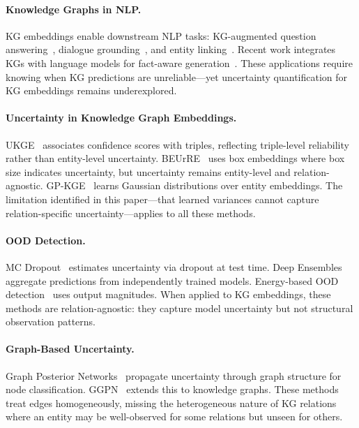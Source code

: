 
\paragraph{Knowledge Graphs in NLP.}
KG embeddings enable downstream NLP tasks: KG-augmented question answering~\citep{zhang2018variational,yasunaga2021qa}, dialogue grounding~\citep{moon2019opendialkg}, and entity linking~\citep{wu2020scalable}.
Recent work integrates KGs with language models for fact-aware generation~\citep{liu2020k,wang2021kepler}.
These applications require knowing when KG predictions are unreliable---yet uncertainty quantification for KG embeddings remains underexplored.

\paragraph{Uncertainty in Knowledge Graph Embeddings.}
UKGE~\citep{chen2019embedding} associates confidence scores with triples, reflecting triple-level reliability rather than entity-level uncertainty.
BEUrRE~\citep{chen2021probabilistic} uses box embeddings where box size indicates uncertainty, but uncertainty remains entity-level and relation-agnostic.
GP-KGE~\citep{Chen2021PERM} learns Gaussian distributions over entity embeddings.
The limitation identified in this paper---that learned variances cannot capture relation-specific uncertainty---applies to all these methods.

\paragraph{OOD Detection.}
MC Dropout~\citep{gal2016dropout} estimates uncertainty via dropout at test time.
Deep Ensembles~\citep{lakshminarayanan2017simple} aggregate predictions from independently trained models.
Energy-based OOD detection~\citep{liu2020energy} uses output magnitudes.
When applied to KG embeddings, these methods are relation-agnostic: they capture model uncertainty but not structural observation patterns.

\paragraph{Graph-Based Uncertainty.}
Graph Posterior Networks~\citep{stadler2021graph} propagate uncertainty through graph structure for node classification.
GGPN~\citep{chen2022graph} extends this to knowledge graphs.
These methods treat edges homogeneously, missing the heterogeneous nature of KG relations where an entity may be well-observed for some relations but unseen for others.

